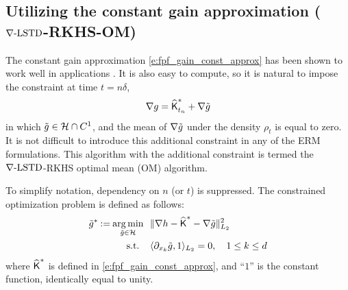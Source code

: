 \subsection{Utilizing the constant gain approximation ($\nabla\text{-LSTD}$-RKHS-OM)}
\label{s:rkhs_om}

The constant gain approximation \eqref{e:fpf_gain_const_approx} has been shown to work well in applications \cite{tilghiomeh13}. It is also easy to compute, so it is natural to impose the constraint at time $t=n\delta$,
\[
\nabla g =  \widehat{\text{\sf K}}^*_{t_n} +  \nabla \tilde g
\]
in which $\tilde g\in {\cal H} \cap C^1$,  and the mean of  $ \nabla \tilde g$ under the density $\rho_t$ is equal to zero.
It is not difficult to introduce this additional constraint in any of the ERM formulations.  This algorithm with the additional constraint is termed the $\nabla\text{-LSTD}$-RKHS optimal mean (OM) algorithm.


To simplify notation, dependency on $n$ (or $t$) is suppressed. The constrained optimization problem is defined as follows:
\[
\begin{aligned}
\tilde g^*  \mathbin{:=} \mathop{\rm arg{\,}min}_{\tilde g\in{\cal H}} \ \  &   \| \nabla h - \widehat{\text{\sf K}}^* - \nabla \tilde g \|^2_{L_2} \\
\text{s.t. }  \ \   & \langle \partial_{x_k} \tilde g , 1 \rangle_{L_2} = 0, \quad     1\le  k \le d
\end{aligned}
\]
where $\widehat{\text{\sf K}}^*$ is defined in \eqref{e:fpf_gain_const_approx},  and ``$1$'' is the constant function, identically equal to unity.


